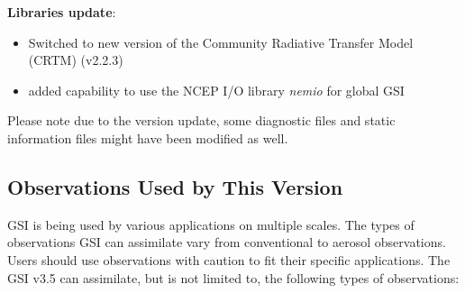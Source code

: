\textbf{Libraries update}:
\begin{itemize}
\item Switched to new version of the Community Radiative Transfer Model (CRTM) (v2.2.3)
\item added capability to use the NCEP I/O library \textit {nemio} for global GSI
\end{itemize}

Please note due to the version update, some diagnostic files and static information files might have been modified as well. 

\subsection{Observations Used by This Version}

GSI is being used by various applications on multiple scales. The types of observations GSI can assimilate vary from conventional to aerosol observations. Users should use observations with caution to fit their specific applications. The GSI v3.5 can assimilate, but is not limited to, the following types of observations:

